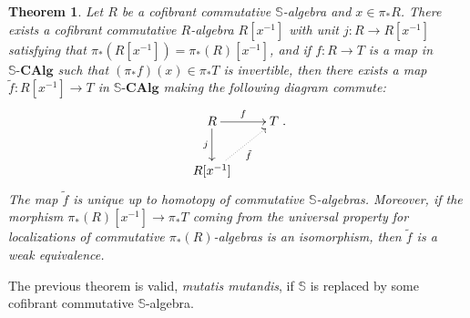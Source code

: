 \documentclass[a4paper,11pt]{amsart} %
\theoremstyle{definition} \newtheorem{defn}[equation]{Definition}
\theoremstyle{remark} \newtheorem{notation}[equation]{Notation}
\theoremstyle{plain} \newtheorem{teo}[equation]{Theorem}
\theoremstyle{plain} \newtheorem{lema}[equation]{Lemma}
\theoremstyle{plain} \newtheorem{prop}[equation]{Proposition}
\theoremstyle{plain} \newtheorem{corolario}[equation]{Corollary}
\theoremstyle{remark} \newtheorem{obs}[equation]{Remark}
\theoremstyle{remark} \newtheorem{sideobs}[equation]{Side remark}
\theoremstyle{remark} \newtheorem{ejercicio}[equation]{Exercise}
\theoremstyle{definition} \newtheorem{notn}[equation]{Notation}
\theoremstyle{remark} \newtheorem{ej}[equation]{Example}
\theoremstyle{remark} \newtheorem{contraej}[equation]{Counterexample}
\theoremstyle{plain} \newtheorem{conj}[equation]{Conjecture}
\renewcommand{\1}{\ensuremath{\mathbbm{1}}}
\renewcommand{\S}{\mathbb{S}}
\newcommand{\bteo}{\begin{teo}}
\newcommand{\eteo}{\end{teo}}
\newcommand{\SCAlg}{\ensuremath{\mathbb{S}}\mbox{-}\ensuremath{\mathbf{CAlg}}}
\numberwithin{equation}{section}
\begin{document}
%
%
\bteo \label{rect} \cite[VIII.2.2, VIII.4.2]{ekmm} Let $R$ be a cofibrant commutative $\S$-algebra and $x\in \pi_*R$. There exists a cofibrant %
commutative $R$-algebra $R[x^{-1}]$ with unit $j:R\to R[x^{-1}]$ satisfying that $\pi_*(R[x^{-1}])=\pi_*(R)[x^{-1}]$, and if $f:R\to T$ is a map in $\SCAlg$ such that $(\pi_*f)(x)\in \pi_*T$ is invertible, then there exists a map $\tilde f:R[x^{-1}]\to T$ in $\SCAlg$ making the following diagram commute:
\[\xymatrix{R\ar[r]^-f \ar[d]_-j & T \\ R[x^{-1}] \ar@{.>}[ru]_{\tilde{f}} }.\]
The map $\tilde f$ is unique up to homotopy of commutative $\S$-algebras. 
Moreover, if the morphism $\pi_*(R)[x^{-1}]\to \pi_*T$ coming from the universal property for localizations of commutative $\pi_*(R)$-algebras is an isomorphism, then $\tilde f$ is a weak equivalence.
\eteo

The previous theorem is valid, \emph{mutatis mutandis}, if $\S$ is replaced by some cofibrant commutative $\S$-algebra.
\end{document}
